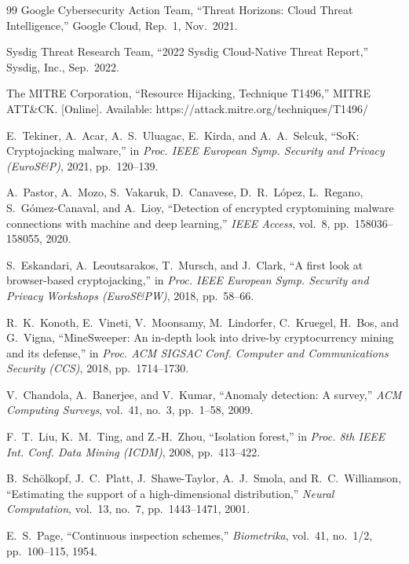 \documentclass[conference]{IEEEtran}
\begin{document}
\begin{thebibliography}{99}
Google Cybersecurity Action Team, ``Threat Horizons: Cloud Threat Intelligence,'' Google Cloud, Rep.~1, Nov.~2021.

Sysdig Threat Research Team, ``2022 Sysdig Cloud-Native Threat Report,'' Sysdig, Inc., Sep.~2022.

The MITRE Corporation, ``Resource Hijacking, Technique T1496,'' MITRE ATT\&CK. [Online]. Available: https://attack.mitre.org/techniques/T1496/

E.~Tekiner, A.~Acar, A.~S.~Uluagac, E.~Kirda, and A.~A.~Selcuk, ``SoK: Cryptojacking malware,'' in \emph{Proc. IEEE European Symp. Security and Privacy (EuroS\&P)}, 2021, pp.~120--139.

A.~Pastor, A.~Mozo, S.~Vakaruk, D.~Canavese, D.~R.~L\'opez, L.~Regano, S.~G\'omez-Canaval, and A.~Lioy, ``Detection of encrypted cryptomining malware connections with machine and deep learning,'' \emph{IEEE Access}, vol.~8, pp.~158036--158055, 2020.

S.~Eskandari, A.~Leoutsarakos, T.~Mursch, and J.~Clark, ``A first look at browser-based cryptojacking,'' in \emph{Proc. IEEE European Symp. Security and Privacy Workshops (EuroS\&PW)}, 2018, pp.~58--66.

R.~K.~Konoth, E.~Vineti, V.~Moonsamy, M.~Lindorfer, C.~Kruegel, H.~Bos, and G.~Vigna, ``MineSweeper: An in-depth look into drive-by cryptocurrency mining and its defense,'' in \emph{Proc. ACM SIGSAC Conf. Computer and Communications Security (CCS)}, 2018, pp.~1714--1730.

V.~Chandola, A.~Banerjee, and V.~Kumar, ``Anomaly detection: A survey,'' \emph{ACM Computing Surveys}, vol.~41, no.~3, pp.~1--58, 2009.

F.~T.~Liu, K.~M.~Ting, and Z.-H.~Zhou, ``Isolation forest,'' in \emph{Proc. 8th IEEE Int. Conf. Data Mining (ICDM)}, 2008, pp.~413--422.

B.~Sch\"olkopf, J.~C.~Platt, J.~Shawe-Taylor, A.~J.~Smola, and R.~C.~Williamson, ``Estimating the support of a high-dimensional distribution,'' \emph{Neural Computation}, vol.~13, no.~7, pp.~1443--1471, 2001.

E.~S.~Page, ``Continuous inspection schemes,'' \emph{Biometrika}, vol.~41, no.~1/2, pp.~100--115, 1954.


\end{thebibliography}
\end{document}
